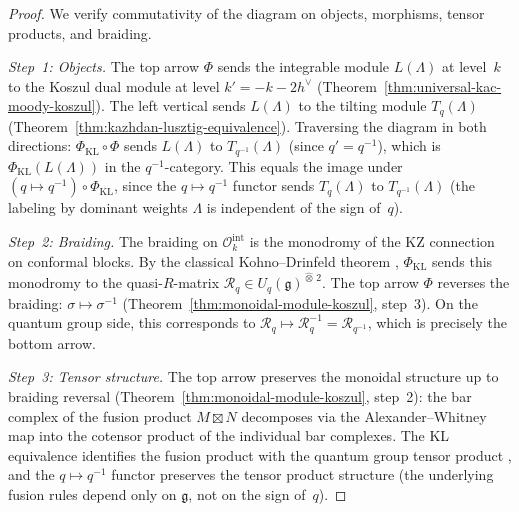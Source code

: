 \begin{proof}
We verify commutativity of the diagram on objects,
morphisms, tensor products, and braiding.

\emph{Step~1: Objects.}
The top arrow $\Phi$ sends the integrable module $L(\Lambda)$
at level~$k$ to the Koszul dual module at level $k' = -k - 2h^\vee$
(Theorem~\ref{thm:universal-kac-moody-koszul}).  The left vertical sends
$L(\Lambda)$ to the tilting module $T_q(\Lambda)$
(Theorem~\ref{thm:kazhdan-lusztig-equivalence}).  Traversing the
diagram in both directions: $\Phi_{\mathrm{KL}} \circ \Phi$
sends $L(\Lambda)$ to $T_{q^{-1}}(\Lambda)$ (since $q' = q^{-1}$),
which is $\Phi_{\mathrm{KL}}(L(\Lambda))$ in the
$q^{-1}$-category.  This equals the image under
$(q \mapsto q^{-1}) \circ \Phi_{\mathrm{KL}}$, since the
$q \mapsto q^{-1}$ functor sends $T_q(\Lambda)$ to
$T_{q^{-1}}(\Lambda)$ (the labeling by dominant weights $\Lambda$
is independent of the sign of~$q$).

\emph{Step~2: Braiding.}
The braiding on $\mathcal{O}_k^{\mathrm{int}}$ is the
monodromy of the KZ connection on conformal blocks.  By the
classical Kohno--Drinfeld theorem \cite{Kohno87, Drinfeld90},
$\Phi_{\mathrm{KL}}$ sends this monodromy to the quasi-$R$-matrix
$\mathcal{R}_q \in U_q(\mathfrak{g})^{\widehat{\otimes}\,2}$.
The top arrow $\Phi$ reverses the braiding:
$\sigma \mapsto \sigma^{-1}$
(Theorem~\ref{thm:monoidal-module-koszul}, step~3).
On the quantum group side, this corresponds to
$\mathcal{R}_q \mapsto \mathcal{R}_q^{-1} = \mathcal{R}_{q^{-1}}$,
which is precisely the bottom arrow.

\emph{Step~3: Tensor structure.}
The top arrow preserves the monoidal structure up to braiding reversal
(Theorem~\ref{thm:monoidal-module-koszul}, step~2): the bar complex
of the fusion product $M \boxtimes N$ decomposes via the Alexander--Whitney
map into the cotensor product of the individual bar complexes.
The KL equivalence identifies the fusion product with the quantum group
tensor product \cite{KL93}, and the $q \mapsto q^{-1}$ functor
preserves the tensor product structure (the underlying fusion rules
depend only on $\mathfrak{g}$, not on the sign of~$q$).
\end{proof}

